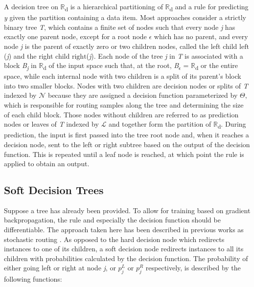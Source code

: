 \documentclass[a4paper,11pt,final]{article}
\begin{document}
A decision tree on $\mathbb{R}$\textsubscript{d} is a hierarchical partitioning of $\mathbb{R}$\textsubscript{d} and a rule for predicting \textit{y} given the partition containing a data item. Most approaches consider a strictly binary tree \textit{T}, which contains a finite set of nodes such that every node \textit{j} has exactly one parent node, except for a root node $\epsilon$ which has no parent, and every node \textit{j} is the parent of exactly zero or two children nodes, called the left child $\mathrm{left}$(\textit{j}) and the right child $\mathrm{right}$(\textit{j}). Each node of the tree \textit{j} in \textit{T} is associated with a block
\textit{B}\textsubscript{\textit{j}} in $\mathbb{R}$\textsubscript{d} of the input space such that, at the root, \textit{B}\textsubscript{$\epsilon$} = $\mathbb{R}$\textsubscript{d} or the entire space, while each internal node with two children is a split of its parent's block into two smaller blocks. Nodes with two children are decision nodes or splits of \textit{T} indexed by $\mathcal{N}$ because they are assigned a decision function parameterized by $\Theta$, which is responsible for routing samples along the tree and determining the size of each child block. Those nodes without children are referred to as prediction nodes or leaves of \textit{T} indexed by $\mathcal{L}$ and together form the partition of $\mathbb{R}$\textsubscript{d}. During prediction, the input is first passed into the tree root node and, when it reaches a decision node, sent to the left or right subtree based on the output of the decision function. This is repeated until a leaf node is reached, at which point the rule is applied to obtain an output.

\subsection{Soft Decision Trees}

Suppose a tree has already been provided. To allow for training based on gradient backpropagation, the rule and especially the decision function should be differentiable. The approach taken here has been described in previous works as stochastic routing \cite{kontschieder2015deep}. As opposed to the hard decision node which redirects instances to one of its children, a soft decision node redirects instances to all its children with probabilities calculated by the decision function. The probability of either going left or right at node \textit{j}, or $p^L_j$ or $p^R_j$ respectively, is described by the following functions:
\end{document}
